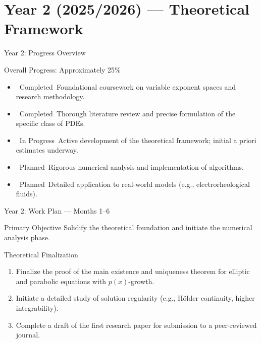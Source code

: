 \documentclass[11pt]{beamer}
\newcommand{\completed}{\textcolor{accentgreen}{\faCheckCircle\ Completed}}
\newcommand{\inprogress}{\textcolor{warningorange}{\faHourglassHalf\ In Progress}}
\newcommand{\planned}{\textcolor{primaryblue}{\faClock\ Planned}}
\begin{document}
	\section{Year 2 (2025/2026) — Theoretical Framework}
	
	\begin{frame}{Year 2: Progress Overview}
		\begin{block}{Overall Progress: Approximately 25\%}
			\begin{itemize}
				\item \completed\ Foundational coursework on variable exponent spaces and research methodology.
				\item \completed\ Thorough literature review and precise formulation of the specific class of PDEs.
				\item \inprogress\ Active development of the theoretical framework; initial a priori estimates underway.
				\item \planned\ Rigorous numerical analysis and implementation of algorithms.
				\item \planned\ Detailed application to real-world models (e.g., electrorheological fluids).
			\end{itemize}
		\end{block}
	\end{frame}
	
	\begin{frame}{Year 2: Work Plan — Months 1--6}
		\begin{block}{Primary Objective}
			Solidify the theoretical foundation and initiate the numerical analysis phase.
		\end{block}
		
		\begin{block}{Theoretical Finalization}
			\begin{enumerate}
				\item Finalize the proof of the main existence and uniqueness theorem for elliptic and parabolic equations with $p(x)$-growth.
				\item Initiate a detailed study of solution regularity (e.g., Hölder continuity, higher integrability).
				\item Complete a draft of the first research paper for submission to a peer-reviewed journal.
			\end{enumerate}
		\end{block}
	\end{frame}
	
\end{document}

